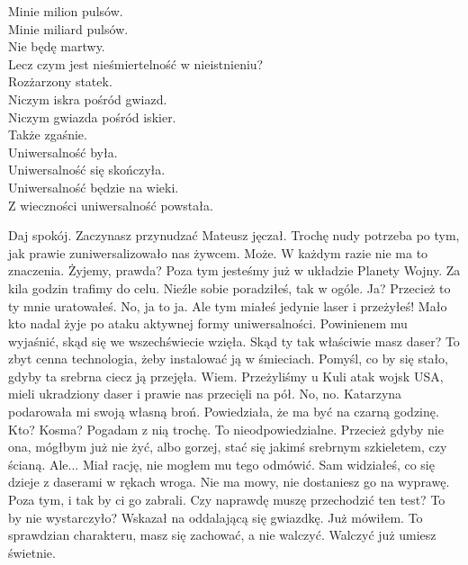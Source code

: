 \noindent
Minie milion pulsów. \\
Minie miliard pulsów. \\
Nie będę martwy. \\
Lecz czym jest nieśmiertelność w nieistnieniu? \\

\noindent
Rozżarzony statek. \\
Niczym iskra pośród gwiazd. \\
Niczym gwiazda pośród iskier. \\
Także zgaśnie. \\

\noindent
Uniwersalność była. \\
Uniwersalność się skończyła. \\
Uniwersalność będzie na wieki. \\
Z wieczności uniwersalność powstała. \\

\begin{dialogue}
\ds{} Daj spokój. Zaczynasz przynudzać \dm{} Mateusz jęczał. 
\ds{} Trochę nudy potrzeba po tym, jak prawie zuniwersalizowało nas żywcem.
\ds{} Może. W każdym razie nie ma to znaczenia. Żyjemy, prawda? Poza tym jesteśmy już w układzie Planety Wojny. Za kila godzin trafimy do celu.
\ds{} Nieźle sobie poradziłeś, tak w ogóle.
\ds{} Ja? Przecież to ty mnie uratowałeś. 
\ds{} No, ja to ja. Ale tym miałeś jedynie laser i przeżyłeś! Mało kto nadal żyje po ataku aktywnej formy uniwersalności. \dm{} Powinienem mu wyjaśnić, skąd się we wszechświecie wzięła. \dm{}
Skąd ty tak właściwie masz daser? To zbyt cenna technologia, żeby instalować ją w śmieciach. Pomyśl, co by się stało, gdyby ta srebrna ciecz ją przejęła.
\ds{} Wiem. Przeżyliśmy u Kuli atak wojsk USA, mieli ukradziony daser i prawie nas przecięli na pół.
\ds{} No, no.
\ds{} Katarzyna podarowała mi swoją własną broń. Powiedziała, że ma być na czarną godzinę.
\ds{} Kto? Kosma? Pogadam z nią trochę. To nieodpowiedzialne.
\ds{} Przecież gdyby nie ona, mógłbym już nie żyć, albo gorzej, stać się jakimś srebrnym szkieletem, czy ścianą.
\ds{} Ale... \dm{} Miał rację, nie mogłem mu tego odmówić. \dm{} Sam widziałeś, co się dzieje z daserami w rękach wroga. Nie ma mowy, nie dostaniesz go na wyprawę.
Poza tym, i tak by ci go zabrali.
\ds{} Czy naprawdę muszę przechodzić ten test? To by nie wystarczyło? \dm{} Wskazał na oddalającą się gwiazdkę.
\ds{} Już mówiłem. To sprawdzian charakteru, masz się zachować, a nie walczyć. Walczyć już umiesz świetnie.
\end{dialogue}

